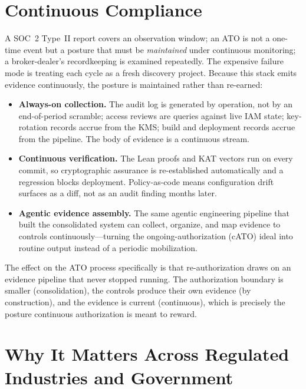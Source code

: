 \documentclass[11pt,letterpaper]{article}
\begin{document}
\section{Continuous Compliance}

A SOC~2 Type~II report covers an observation window; an ATO is not a one-time event
but a posture that must be \emph{maintained} under continuous monitoring; a
broker-dealer's recordkeeping is examined repeatedly. The expensive failure mode is
treating each cycle as a fresh discovery project. Because this stack emits evidence
continuously, the posture is maintained rather than re-earned:

\begin{itemize}
  \item \textbf{Always-on collection.} The audit log is generated by operation, not
  by an end-of-period scramble; access reviews are queries against live IAM state;
  key-rotation records accrue from the KMS; build and deployment records accrue from
  the pipeline. The body of evidence is a continuous stream.
  \item \textbf{Continuous verification.} The Lean proofs and KAT vectors run on every
  commit, so cryptographic assurance is re-established automatically and a regression
  blocks deployment. Policy-as-code means configuration drift surfaces as a diff, not
  as an audit finding months later.
  \item \textbf{Agentic evidence assembly.} The same agentic engineering pipeline that
  built the consolidated system can collect, organize, and map evidence to controls
  continuously---turning the ongoing-authorization (cATO) ideal into routine output
  instead of a periodic mobilization.
\end{itemize}

The effect on the ATO process specifically is that re-authorization draws on an
evidence pipeline that never stopped running. The authorization boundary is smaller
(consolidation), the controls produce their own evidence (by construction), and the
evidence is current (continuous), which is precisely the posture continuous
authorization is meant to reward.

\section{Why It Matters Across Regulated Industries and Government}
\end{document}
